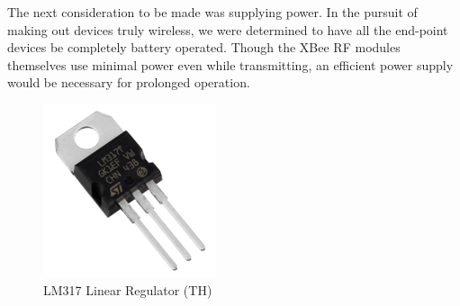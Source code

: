 \par The next consideration to be made was supplying power. In the pursuit of making out devices truly wireless, we were determined to have all the end-point devices be completely battery operated. Though the XBee RF modules themselves use minimal power even while transmitting, an efficient power supply would be necessary for prolonged operation. 
	\begin{figure}
		\includegraphics[width=2in]{lm317.jpg}
		\caption{\small LM317 Linear Regulator (TH)}
	\end{figure}
